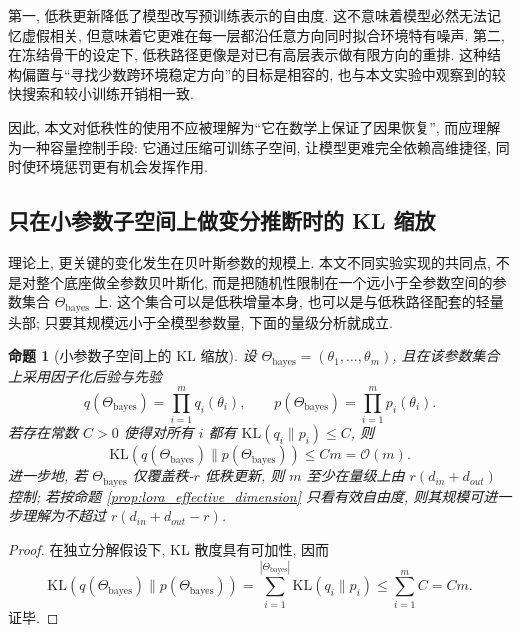 \documentclass[a4paper,punct=banjiao,twoside]{ctexrep}
\theoremstyle{plain}
\newtheorem{prop}[thm]{命题}
\theoremstyle{definition}
\theoremstyle{remark}
\begin{document}
第一, 低秩更新降低了模型改写预训练表示的自由度. 这不意味着模型必然无法记忆虚假相关, 但意味着它更难在每一层都沿任意方向同时拟合环境特有噪声. 第二, 在冻结骨干的设定下, 低秩路径更像是对已有高层表示做有限方向的重排. 这种结构偏置与“寻找少数跨环境稳定方向”的目标是相容的, 也与本文实验中观察到的较快搜索和较小训练开销相一致.

因此, 本文对低秩性的使用不应被理解为“它在数学上保证了因果恢复”, 而应理解为一种容量控制手段: 它通过压缩可训练子空间, 让模型更难完全依赖高维捷径, 同时使环境惩罚更有机会发挥作用.

\subsection{只在小参数子空间上做变分推断时的 KL 缩放}

理论上, 更关键的变化发生在贝叶斯参数的规模上. 本文不同实验实现的共同点, 不是对整个底座做全参数贝叶斯化, 而是把随机性限制在一个远小于全参数空间的参数集合 $\Theta_{\text{bayes}}$ 上. 这个集合可以是低秩增量本身, 也可以是与低秩路径配套的轻量头部; 只要其规模远小于全模型参数量, 下面的量级分析就成立.

\begin{prop}[小参数子空间上的 KL 缩放]
\label{prop:kl_small_subspace}
设 $\Theta_{\text{bayes}} = (\theta_1,\dots,\theta_m)$, 且在该参数集合上采用因子化后验与先验
\begin{equation}
    q(\Theta_{\text{bayes}})=\prod_{i=1}^{m} q_i(\theta_i), \qquad
    p(\Theta_{\text{bayes}})=\prod_{i=1}^{m} p_i(\theta_i).
\end{equation}
若存在常数 $C>0$ 使得对所有 $i$ 都有 $\mathrm{KL}(q_i\|p_i) \le C$, 则
\begin{equation}
    \mathrm{KL}\!\left(q(\Theta_{\text{bayes}})\|p(\Theta_{\text{bayes}})\right)
    \le C m
    = \mathcal{O}(m).
\end{equation}
进一步地, 若 $\Theta_{\text{bayes}}$ 仅覆盖秩-$r$ 低秩更新, 则 $m$ 至少在量级上由 $r(d_{in}+d_{out})$ 控制; 若按命题 \ref{prop:lora_effective_dimension} 只看有效自由度, 则其规模可进一步理解为不超过 $r(d_{in}+d_{out}-r)$.
\end{prop}

\begin{proof}
在独立分解假设下, KL 散度具有可加性, 因而
\begin{equation}
    \text{KL}(q(\Theta_{\text{bayes}})\|p(\Theta_{\text{bayes}}))
    = \sum_{i=1}^{|\Theta_{\text{bayes}}|} \text{KL}(q_i\|p_i)
    \le \sum_{i=1}^{m} C
    = C m.
\end{equation}
证毕.
\end{proof}
\end{document}
